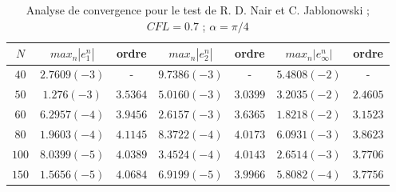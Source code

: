 \begin{table}[ht]
\begin{center}
\begin{tabular}{c|cc|cc|cc}
$N$ & $max_n |e_1^n|$ & ordre  & $max_n |e_2^n|$ & ordre  & $max_n |e_{\infty}^n|$ & ordre \\
\hline
\hline
$40$ & $2.7609 (-3)$ & -  & $9.7386 (-3)$ & - & $5.4808 (-2)$  & - \\
\hline 
$50$ & $1.276 (-3)$ & $3.5364$ & $5.0160 (-3)$ & $3.0399$ & $3.2035 (-2)$ & $2.4605$ \\
\hline
$60$ & $6.2957 (-4)$ & $3.9456$ & $2.6157 (-3)$ & $3.6365$ & $1.8218 (-2)$ & $3.1523$ \\
\hline
$80$ & $1.9603 (-4) $ & $4.1145$ & $8.3722 (-4)$ & $4.0173$ & $6.0931 (-3)$ & $3.8623$ \\
\hline
$100$ & $8.0399 (-5)$ & $4.0389$ & $3.4524 (-4)$ & $4.0143$ & $2.6514 (-3)$ & $3.7706$\\
\hline
$150$ & $1.5656 (-5)$ & $4.0684$ & $6.9199 (-5)$ & $3.9966$ & $5.8082 (-4)$ & $3.7756$
\end{tabular}
\caption{Analyse de convergence pour le test de R. D. Nair et C. Jablonowski \cite{Nair2008} ; $CFL = 0.7$ ; $\alpha = \pi /4$}
\label{table NJ1}
\end{center}
\end{table}